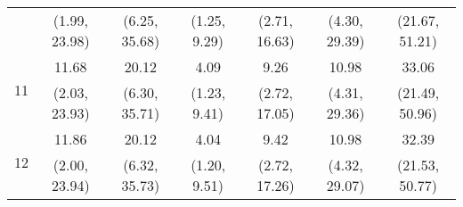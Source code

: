 \documentclass{article}
\begin{document}
\begin{table}
\begin{tabular}{ccccccc}
		 & (1.99, 23.98) & (6.25, 35.68) & (1.25, 9.29) & (2.71, 16.63) & (4.30, 29.39) & (21.67, 51.21)\\
		\multirow{2}{*}{11} & 11.68 & 20.12 & 4.09 & 9.26 & 10.98 & 33.06\\
		 & (2.03, 23.93) & (6.30, 35.71) & (1.23, 9.41) & (2.72, 17.05) & (4.31, 29.36) & (21.49, 50.96)\\
		\multirow{2}{*}{12} & 11.86 & 20.12 & 4.04 & 9.42 & 10.98 & 32.39\\
		 & (2.00, 23.94) & (6.32, 35.73) & (1.20, 9.51) & (2.72, 17.26) & (4.32, 29.07) & (21.53, 50.77)\\
	\end{tabular}
\label{tab:fevd-Model_PERR_Q_govexp-gdpRealQoq}
\end{table}
\end{document}

